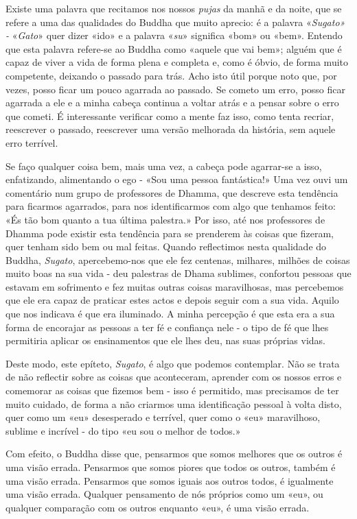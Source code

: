 Existe uma palavra que recitamos nos nossos \emph{pujas} da manhã e da
noite, que se refere a uma das qualidades do Buddha que muito aprecio: é
a palavra «\emph{Sugato» -} «\emph{Gato}» quer dizer «ido» e a palavra
«\emph{su}» significa «bom» ou «bem». Entendo que esta palavra refere-se
ao Buddha como «aquele que vai bem»; alguém que é capaz de viver a vida
de forma plena e completa e, como é óbvio, de forma muito competente,
deixando o passado para trás. Acho isto útil porque noto que, por vezes,
posso ficar um pouco agarrada ao passado. Se cometo um erro, posso ficar
agarrada a ele e a minha cabeça continua a voltar atrás e a pensar sobre
o erro que cometi. É interessante verificar como a mente faz isso, como
tenta recriar, reescrever o passado, reescrever uma versão melhorada da
história, sem aquele erro terrível.

Se faço qualquer coisa bem, mais uma vez, a cabeça pode agarrar-se a
isso, enfatizando, alimentando o ego - «Sou uma pessoa fantástica!» Uma
vez ouvi um comentário num grupo de professores de Dhamma, que descreve
esta tendência para ficarmos agarrados, para nos identificarmos com algo
que tenhamos feito: «És tão bom quanto a tua última palestra.» Por isso,
até nos professores de Dhamma pode existir esta tendência para se
prenderem às coisas que fizeram, quer tenham sido bem ou mal feitas.
Quando reflectimos nesta qualidade do Buddha, \emph{Sugato},
apercebemo-nos que ele fez centenas, milhares, milhões de coisas muito
boas na sua vida - deu palestras de Dhama sublimes, confortou pessoas
que estavam em sofrimento e fez muitas outras coisas maravilhosas, mas
percebemos que ele era capaz de praticar estes actos e depois seguir com
a sua vida. Aquilo que nos indicava é que era iluminado. A minha
percepção é que esta era a sua forma de encorajar as pessoas a ter fé e
confiança nele - o tipo de fé que lhes permitiria aplicar os
ensinamentos que ele lhes deu, nas suas próprias vidas.

Deste modo, este epíteto, \emph{Sugato}, é algo que podemos contemplar.
Não se trata de não reflectir sobre as coisas que aconteceram, aprender
com os nossos erros e comemorar as coisas que fizemos bem - isso é
permitido, mas precisamos de ter muito cuidado, de forma a não criarmos
uma identificação pessoal à volta disto, quer como um «eu» desesperado e
terrível, quer como o «eu» maravilhoso, sublime e incrível - do tipo «eu
sou o melhor de todos.»

Com efeito, o Buddha disse que, pensarmos que somos melhores que os
outros é uma visão errada. Pensarmos que somos piores que todos os
outros, também é uma visão errada. Pensarmos que somos iguais aos outros
todos, é igualmente uma visão errada. Qualquer pensamento de nós
próprios como um «eu», ou qualquer comparação com os outros enquanto
«eu», é uma visão errada.


